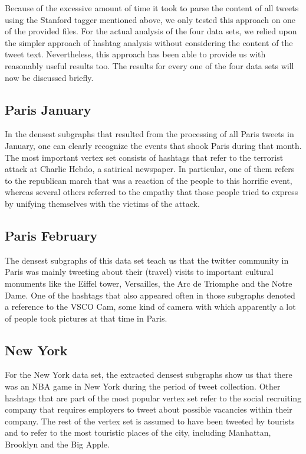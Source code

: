 \documentclass[10pt,a4paper]{article}
\begin{document}
Because of the excessive amount of time it took to parse the content of all tweets using the Stanford tagger mentioned above, we only tested this approach on one of the provided files. For the actual analysis of the four data sets, we relied upon the simpler approach of hashtag analysis without considering the content of the tweet text. Nevertheless, this approach has been able to provide us with reasonably useful results too. The results for every one of the four data sets will now be discussed briefly.

\subsection{Paris January}

In the densest subgraphs that resulted from the processing of all Paris tweets in January, one can clearly recognize the events that shook Paris during that month. The most important vertex set consists of hashtags that refer to the terrorist attack at Charlie Hebdo, a satirical newspaper. In particular, one of them refers to the republican march that was a reaction of the people to this horrific event, whereas several others referred to the empathy that those people tried to express by unifying themselves with the victims of the attack.

\subsection{Paris February}

The densest subgraphs of this data set teach us that the twitter community in Paris was mainly tweeting about their (travel) visits to important cultural monuments like the Eiffel tower, Versailles, the Arc de Triomphe and the Notre Dame. One of the hashtags that also appeared often in those subgraphs denoted a reference to the VSCO Cam, some kind of camera with which apparently a lot of people took pictures at that time in Paris.

\subsection{New York}

For the New York data set, the extracted densest subgraphs show us that there was an NBA game in New York during the period of tweet collection. Other hashtags that are part of the most popular vertex set refer to the social recruiting company that requires employers to tweet about possible vacancies within their company. The rest of the vertex set is assumed to have been tweeted by tourists and to refer to the most touristic places of the city, including Manhattan, Brooklyn and the Big Apple.
\end{document}
